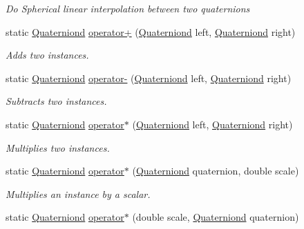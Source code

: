 \begin{DoxyCompactItemize}
\begin{DoxyCompactList}\small\item\em Do Spherical linear interpolation between two quaternions \end{DoxyCompactList}\item 
static \hyperlink{struct_open_t_k_1_1_quaterniond}{Quaterniond} \hyperlink{struct_open_t_k_1_1_quaterniond_a16578fc288f05255360d0266596d1adc}{operator+} (\hyperlink{struct_open_t_k_1_1_quaterniond}{Quaterniond} left, \hyperlink{struct_open_t_k_1_1_quaterniond}{Quaterniond} right)
\begin{DoxyCompactList}\small\item\em Adds two instances. \end{DoxyCompactList}\item 
static \hyperlink{struct_open_t_k_1_1_quaterniond}{Quaterniond} \hyperlink{struct_open_t_k_1_1_quaterniond_a94d5c0b541389c5a0782bd371b8f090d}{operator-\/} (\hyperlink{struct_open_t_k_1_1_quaterniond}{Quaterniond} left, \hyperlink{struct_open_t_k_1_1_quaterniond}{Quaterniond} right)
\begin{DoxyCompactList}\small\item\em Subtracts two instances. \end{DoxyCompactList}\item 
static \hyperlink{struct_open_t_k_1_1_quaterniond}{Quaterniond} \hyperlink{struct_open_t_k_1_1_quaterniond_a6b06ee7345dab7702f70237e6c77c0af}{operator$\ast$} (\hyperlink{struct_open_t_k_1_1_quaterniond}{Quaterniond} left, \hyperlink{struct_open_t_k_1_1_quaterniond}{Quaterniond} right)
\begin{DoxyCompactList}\small\item\em Multiplies two instances. \end{DoxyCompactList}\item 
static \hyperlink{struct_open_t_k_1_1_quaterniond}{Quaterniond} \hyperlink{struct_open_t_k_1_1_quaterniond_a2bf2debad1c579562d583b23958438fc}{operator$\ast$} (\hyperlink{struct_open_t_k_1_1_quaterniond}{Quaterniond} quaternion, double scale)
\begin{DoxyCompactList}\small\item\em Multiplies an instance by a scalar. \end{DoxyCompactList}\item 
static \hyperlink{struct_open_t_k_1_1_quaterniond}{Quaterniond} \hyperlink{struct_open_t_k_1_1_quaterniond_a572d99c01d99e0a93317c6275fe38859}{operator$\ast$} (double scale, \hyperlink{struct_open_t_k_1_1_quaterniond}{Quaterniond} quaternion)

\end{DoxyCompactItemize}

